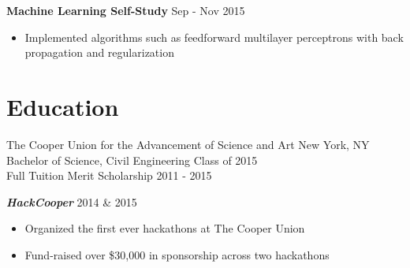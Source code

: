 \documentclass[overlapped]{res}
\begin{document}
\begin{resume}
    {\bf Machine Learning Self-Study} \hfill Sep - Nov 2015
    \begin{itemize} \itemsep-2pt
        \item
          Implemented algorithms such as feedforward multilayer perceptrons with back propagation and regularization
    \end{itemize}


    \section{Education}
    The Cooper Union for the Advancement of Science and Art \hfill New York, NY  \\
    Bachelor of Science, Civil Engineering              \hfill Class of 2015 \\
    Full Tuition Merit Scholarship                          \hfill 2011 - 2015


    {\bf {\em HackCooper\/}} \hfill 2014 \& 2015
    \begin{itemize} \itemsep-2pt
        \item
            Organized the first ever hackathons at The Cooper Union
        \item
            Fund-raised over \$30,000 in sponsorship across two hackathons
    \end{itemize}


\end{resume}
\end{document}
